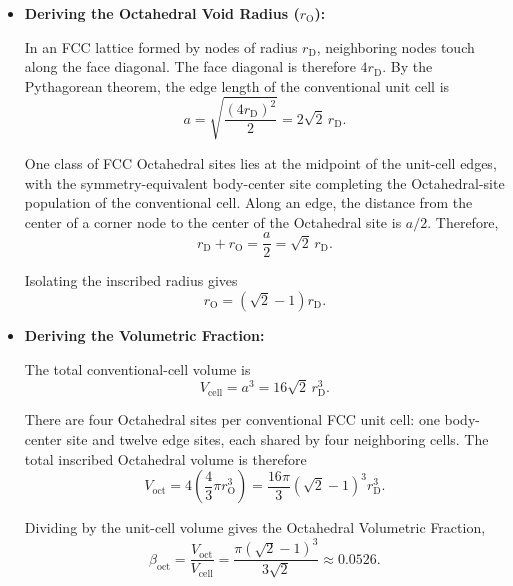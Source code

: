 \begin{itemize}

    \item \textbf{Deriving the Octahedral Void Radius ($r_{\mathrm{O}}$):}

    In an FCC lattice formed by nodes of radius $r_{\mathrm{D}}$, neighboring nodes touch along the face diagonal. The face diagonal is therefore $4r_{\mathrm{D}}$. By the Pythagorean theorem, the edge length of the conventional unit cell is
    \begin{equation}
        a
        =
        \sqrt{\frac{(4r_{\mathrm{D}})^2}{2}}
        =
        2\sqrt{2}\,r_{\mathrm{D}}.
    \end{equation}

    One class of FCC Octahedral sites lies at the midpoint of the unit-cell edges, with the symmetry-equivalent body-center site completing the Octahedral-site population of the conventional cell. Along an edge, the distance from the center of a corner node to the center of the Octahedral site is $a/2$. Therefore,
    \begin{equation}
        r_{\mathrm{D}}+r_{\mathrm{O}}
        =
        \frac{a}{2}
        =
        \sqrt{2}\,r_{\mathrm{D}}.
    \end{equation}

    Isolating the inscribed radius gives
    \begin{equation}
        r_{\mathrm{O}}
        =
        (\sqrt{2}-1)r_{\mathrm{D}}.
    \end{equation}

    \item \textbf{Deriving the Volumetric Fraction:}

    The total conventional-cell volume is
    \begin{equation}
        V_{\mathrm{cell}}
        =
        a^3
        =
        16\sqrt{2}\,r_{\mathrm{D}}^3.
    \end{equation}

    There are four Octahedral sites per conventional FCC unit cell: one body-center site and twelve edge sites, each shared by four neighboring cells. The total inscribed Octahedral volume is therefore
    \begin{equation}
        V_{\mathrm{oct}}
        =
        4
        \left(
            \frac{4}{3}\pi r_{\mathrm{O}}^3
        \right)
        =
        \frac{16\pi}{3}
        (\sqrt{2}-1)^3r_{\mathrm{D}}^3.
    \end{equation}

    Dividing by the unit-cell volume gives the Octahedral Volumetric Fraction,
    \begin{equation}
        \beta_{\mathrm{oct}}
        =
        \frac{V_{\mathrm{oct}}}{V_{\mathrm{cell}}}
        =
        \frac{\pi(\sqrt{2}-1)^3}{3\sqrt{2}}
        \approx
        0.0526.
    \end{equation}

\end{itemize}

